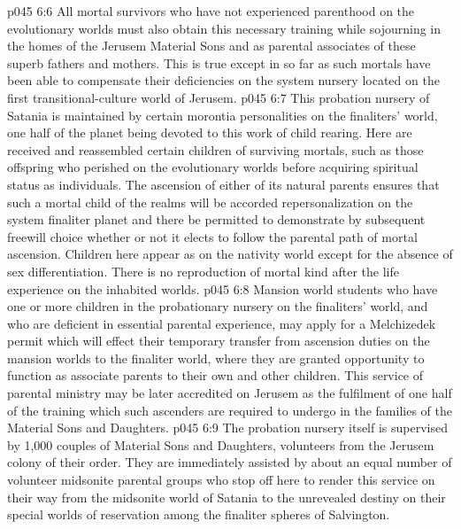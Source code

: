 \vs p045 6:6 All mortal survivors who have not experienced parenthood on the evolutionary worlds must also obtain this necessary training while sojourning in the homes of the Jerusem Material Sons and as parental associates of these superb fathers and mothers. This is true except in so far as such mortals have been able to compensate their deficiencies on the system nursery located on the first transitional\hyp{}culture world of Jerusem.
\vs p045 6:7 \pc This probation nursery of Satania is maintained by certain morontia personalities on the finaliters’ world, one half of the planet being devoted to this work of child rearing. Here are received and reassembled certain children of surviving mortals, such as those offspring who perished on the evolutionary worlds before acquiring spiritual status as individuals. The ascension of either of its natural parents ensures that such a mortal child of the realms will be accorded repersonalization on the system finaliter planet and there be permitted to demonstrate by subsequent freewill choice whether or not it elects to follow the parental path of mortal ascension. Children here appear as on the nativity world except for the absence of sex differentiation. There is no reproduction of mortal kind after the life experience on the inhabited worlds.
\vs p045 6:8 Mansion world students who have one or more children in the probationary nursery on the finaliters’ world, and who are deficient in essential parental experience, may apply for a Melchizedek permit which will effect their temporary transfer from ascension duties on the mansion worlds to the finaliter world, where they are granted opportunity to function as associate parents to their own and other children. This service of parental ministry may be later accredited on Jerusem as the fulfilment of one half of the training which such ascenders are required to undergo in the families of the Material Sons and Daughters.
\vs p045 6:9 The probation nursery itself is supervised by 1,000 couples of Material Sons and Daughters, volunteers from the Jerusem colony of their order. They are immediately assisted by about an equal number of volunteer midsonite parental groups who stop off here to render this service on their way from the midsonite world of Satania to the unrevealed destiny on their special worlds of reservation among the finaliter spheres of Salvington.
